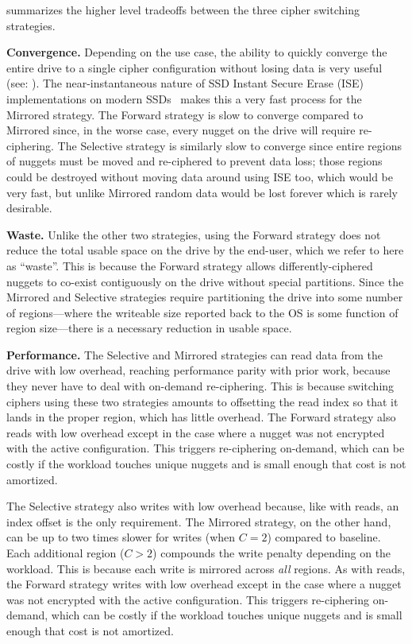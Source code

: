  summarizes the higher level tradeoffs between the
three cipher switching strategies.

\textbf{Convergence.} Depending on the use case, the ability to quickly converge
the entire drive to a single cipher configuration without losing data is very
useful (see: ). The near-instantaneous nature of SSD Instant
Secure Erase (ISE) implementations on modern SSDs~\cite{ISE1,ISE2,ISE3} makes
this a very fast process for the Mirrored strategy. The Forward strategy is slow
to converge compared to Mirrored since, in the worse case, every nugget on the
drive will require re-ciphering. The Selective strategy is similarly slow to
converge since entire regions of nuggets must be moved and re-ciphered to
prevent data loss; those regions could be destroyed without moving data around
using ISE too, which would be very fast, but unlike Mirrored random data would
be lost forever which is rarely desirable.

\textbf{Waste.} Unlike the other two strategies, using the Forward strategy does
not reduce the total usable space on the drive by the end-user, which we refer
to here as ``waste''. This is because the Forward strategy allows
differently-ciphered nuggets to co-exist contiguously on the drive without
special partitions. Since the Mirrored and Selective strategies require
partitioning the drive into some number of regions---where the writeable size
reported back to the OS is some function of region size---there is a necessary
reduction in usable space.

\textbf{Performance.} The Selective and Mirrored strategies can read data from
the drive with low overhead, reaching performance parity with prior work,
because they never have to deal with on-demand re-ciphering. This is because
switching ciphers using these two strategies amounts to offsetting the read
index so that it lands in the proper region, which has little overhead. The
Forward strategy also reads with low overhead except in the case where a nugget
was not encrypted with the active configuration. This triggers re-ciphering
on-demand, which can be costly if the workload touches unique nuggets and is
small enough that cost is not amortized.

The Selective strategy also writes with low overhead because, like with reads,
an index offset is the only requirement. The Mirrored strategy, on the other
hand, can be up to two times slower for writes (when $C = 2$) compared to
baseline. Each additional region ($C > 2$) compounds the write penalty depending
on the workload. This is because each write is mirrored across \emph{all}
regions. As with reads, the Forward strategy writes with low overhead except in
the case where a nugget was not encrypted with the active configuration. This
triggers re-ciphering on-demand, which can be costly if the workload touches
unique nuggets and is small enough that cost is not amortized.\\

